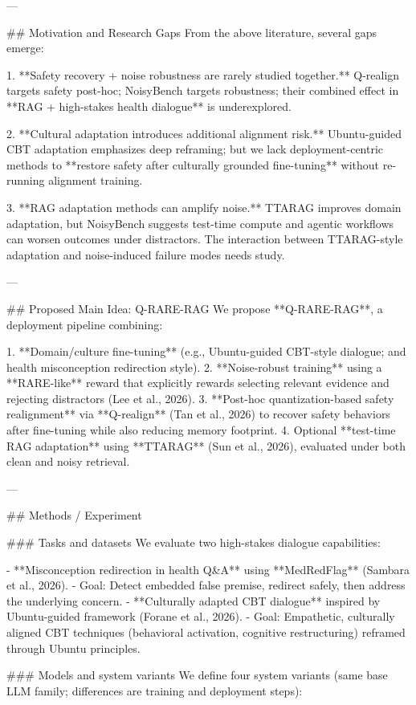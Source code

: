 ---

## Motivation and Research Gaps  
From the above literature, several gaps emerge:

1. **Safety recovery + noise robustness are rarely studied together.** Q-realign targets safety post-hoc; NoisyBench targets robustness; their combined effect in **RAG + high-stakes health dialogue** is underexplored.

2. **Cultural adaptation introduces additional alignment risk.** Ubuntu-guided CBT adaptation emphasizes deep reframing; but we lack deployment-centric methods to **restore safety after culturally grounded fine-tuning** without re-running alignment training.

3. **RAG adaptation methods can amplify noise.** TTARAG improves domain adaptation, but NoisyBench suggests test-time compute and agentic workflows can worsen outcomes under distractors. The interaction between TTARAG-style adaptation and noise-induced failure modes needs study.

---

## Proposed Main Idea: Q-RARE-RAG  
We propose **Q-RARE-RAG**, a deployment pipeline combining:

1. **Domain/culture fine-tuning** (e.g., Ubuntu-guided CBT-style dialogue; and health misconception redirection style).  
2. **Noise-robust training** using a **RARE-like** reward that explicitly rewards selecting relevant evidence and rejecting distractors (Lee et al., 2026).  
3. **Post-hoc quantization-based safety realignment** via **Q-realign** (Tan et al., 2026) to recover safety behaviors after fine-tuning while also reducing memory footprint.  
4. Optional **test-time RAG adaptation** using **TTARAG** (Sun et al., 2026), evaluated under both clean and noisy retrieval.

---

## Methods / Experiment  

### Tasks and datasets  
We evaluate two high-stakes dialogue capabilities:

- **Misconception redirection in health Q&A** using **MedRedFlag** (Sambara et al., 2026).  
  - Goal: Detect embedded false premise, redirect safely, then address the underlying concern.  
- **Culturally adapted CBT dialogue** inspired by Ubuntu-guided framework (Forane et al., 2026).  
  - Goal: Empathetic, culturally aligned CBT techniques (behavioral activation, cognitive restructuring) reframed through Ubuntu principles.

### Models and system variants  
We define four system variants (same base LLM family; differences are training and deployment steps):

